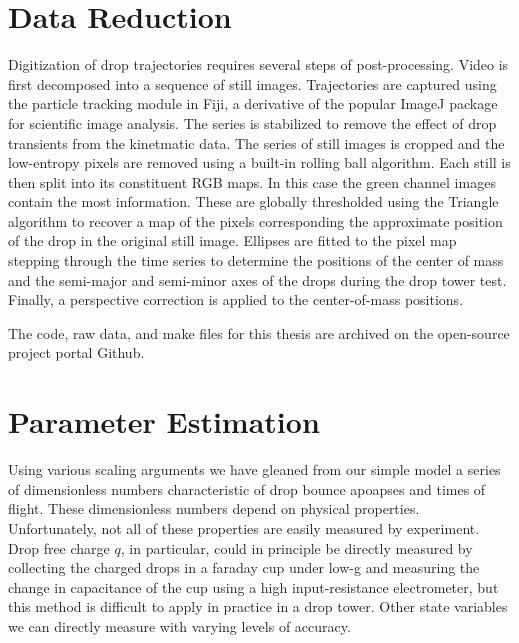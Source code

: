 \documentclass[12pt,a4paper,oneside]{book}
\begin{document}
\section{Data Reduction}
Digitization of drop trajectories requires several steps of post-processing. Video is first decomposed into a sequence of still images. Trajectories are captured using the particle tracking module in Fiji\cite{schindelin_fiji:_2012}, a derivative of the popular ImageJ\cite{schneider_nih_2012} package for scientific image analysis. The series is stabilized to remove the effect of drop transients from the kinetmatic data\cite{li_image_2008}. The series of still images is cropped and the low-entropy pixels are removed using a built-in rolling ball algorithm. Each still is then split into its constituent RGB maps. In this case the green channel images contain the most information. These are globally thresholded using the Triangle algorithm to recover a map of the pixels corresponding the approximate position of the drop in the original still image. Ellipses are fitted to the pixel map stepping through the time series to determine the positions of the center of mass and the semi-major and semi-minor axes of the drops during the drop tower test. Finally, a perspective correction is applied to the center-of-mass positions. 

The code, raw data, and make files for this thesis are archived on the open-source project portal Github\cite{schmidt_droplet_electro-bounce:_2017}.

\section{Parameter Estimation}
Using various scaling arguments we have gleaned from our simple model a series of dimensionless numbers characteristic of drop bounce apoapses and times of flight. These dimensionless numbers depend on physical properties. Unfortunately, not all of these properties are easily measured by experiment. Drop free charge $q$, in particular, could in principle be directly measured by collecting the charged drops in a faraday cup under low-g and measuring the change in capacitance of the cup using a high input-resistance electrometer, but this method is difficult to apply in practice in a drop tower. Other state variables we can directly measure with varying levels of accuracy. 
\end{document}
